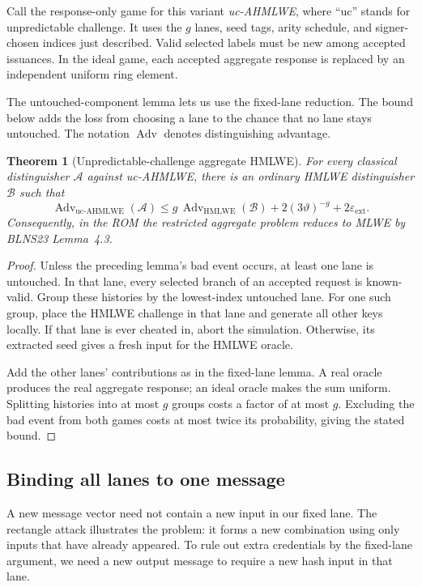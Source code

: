\documentclass[10pt]{article}
\newtheorem{theorem}{Theorem}
\begin{document}
Call the response-only game for this variant \emph{uc-AHMLWE}, where ``uc''
stands for unpredictable challenge.  It uses the $g$ lanes, seed tags, arity
schedule, and signer-chosen indices just described.  Valid selected labels
must be new among accepted issuances.  In the ideal game, each accepted
aggregate response is replaced by an independent uniform ring element.

The untouched-component lemma lets us use the fixed-lane reduction.  The
bound below adds the loss from choosing a lane to the chance that no lane
stays untouched.  The notation $\operatorname{Adv}$ denotes distinguishing
advantage.

\begin{theorem}[Unpredictable-challenge aggregate HMLWE]
For every classical distinguisher $\mathcal A$ against uc-AHMLWE, there is an
ordinary HMLWE distinguisher $\mathcal B$ such that
\[
 \operatorname{Adv}_{\mathrm{uc\text{-}AHMLWE}}(\mathcal A)
 \leq
 g\,\operatorname{Adv}_{\mathrm{HMLWE}}(\mathcal B)
 +2(3\vartheta)^{-g}+2\varepsilon_{\mathrm{ext}}.
\]
Consequently, in the ROM the restricted aggregate problem reduces to MLWE by
BLNS23 Lemma~4.3.
\end{theorem}

\begin{proof}
Unless the preceding lemma's bad event occurs, at least one lane is
untouched.  In that lane, every selected branch of an accepted request is
known-valid.  Group these histories by the lowest-index untouched lane.
For one such group, place the HMLWE challenge in that lane and generate all
other keys locally.  If that lane is ever cheated in, abort the simulation.
Otherwise, its extracted seed gives a fresh input for the HMLWE oracle.

Add the other lanes' contributions as in the fixed-lane lemma.  A real
oracle produces the real aggregate response; an ideal oracle makes the sum
uniform.  Splitting histories into at most $g$ groups costs a factor of at
most $g$.  Excluding the bad event from both games costs at most twice its
probability, giving the stated bound.
\end{proof}

\subsection{Binding all lanes to one message}\label{sec:common-message}

A new message vector need not contain a new input in our fixed lane.  The
rectangle attack illustrates the problem: it forms a new combination using
only inputs that have already appeared.  To rule out extra credentials by
the fixed-lane argument, we need a new output message to require a new hash
input in that lane.
\end{document}

